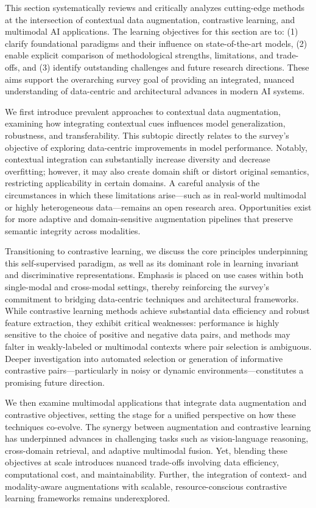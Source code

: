 \documentclass[sigconf]{acmart}
\begin{document}
This section systematically reviews and critically analyzes cutting-edge methods at the intersection of contextual data augmentation, contrastive learning, and multimodal AI applications. The learning objectives for this section are to: (1) clarify foundational paradigms and their influence on state-of-the-art models, (2) enable explicit comparison of methodological strengths, limitations, and trade-offs, and (3) identify outstanding challenges and future research directions. These aims support the overarching survey goal of providing an integrated, nuanced understanding of data-centric and architectural advances in modern AI systems.

We first introduce prevalent approaches to contextual data augmentation, examining how integrating contextual cues influences model generalization, robustness, and transferability. This subtopic directly relates to the survey's objective of exploring data-centric improvements in model performance. Notably, contextual integration can substantially increase diversity and decrease overfitting; however, it may also create domain shift or distort original semantics, restricting applicability in certain domains. A careful analysis of the circumstances in which these limitations arise—such as in real-world multimodal or highly heterogeneous data—remains an open research area. Opportunities exist for more adaptive and domain-sensitive augmentation pipelines that preserve semantic integrity across modalities.

Transitioning to contrastive learning, we discuss the core principles underpinning this self-supervised paradigm, as well as its dominant role in learning invariant and discriminative representations. Emphasis is placed on use cases within both single-modal and cross-modal settings, thereby reinforcing the survey's commitment to bridging data-centric techniques and architectural frameworks. While contrastive learning methods achieve substantial data efficiency and robust feature extraction, they exhibit critical weaknesses: performance is highly sensitive to the choice of positive and negative data pairs, and methods may falter in weakly-labeled or multimodal contexts where pair selection is ambiguous. Deeper investigation into automated selection or generation of informative contrastive pairs—particularly in noisy or dynamic environments—constitutes a promising future direction.

We then examine multimodal applications that integrate data augmentation and contrastive objectives, setting the stage for a unified perspective on how these techniques co-evolve. The synergy between augmentation and contrastive learning has underpinned advances in challenging tasks such as vision-language reasoning, cross-domain retrieval, and adaptive multimodal fusion. Yet, blending these objectives at scale introduces nuanced trade-offs involving data efficiency, computational cost, and maintainability. Further, the integration of context- and modality-aware augmentations with scalable, resource-conscious contrastive learning frameworks remains underexplored.
\end{document}
